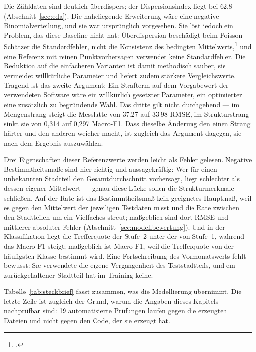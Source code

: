 Die Zähldaten sind deutlich überdispers; der Dispersionsindex liegt bei 62,8
(Abschnitt~\ref{sec:eda}). Die naheliegende Erweiterung wäre eine negative
Binomialverteilung, und sie war ursprünglich vorgesehen. Sie löst jedoch ein
Problem, das diese Baseline nicht hat: Überdispersion beschädigt beim
Poisson-Schätzer die Standardfehler, nicht die Konsistenz des bedingten
Mittelwerts,\footcite[5]{Gourieroux1981} und eine Referenz mit reinen
Punktvorhersagen verwendet keine Standardfehler. Die Reduktion auf die
einfacheren Varianten ist damit methodisch sauber, sie vermeidet willkürliche
Parameter und liefert zudem stärkere Vergleichswerte. Tragend ist das zweite
Argument: Ein Strafterm auf dem Vorgabewert der verwendeten Software wäre ein
willkürlich gesetzter Parameter, ein optimierter eine zusätzlich zu begründende
Wahl. Das dritte gilt nicht durchgehend --- im Mengenstrang steigt die
Messlatte von 37,27 auf 33,98 RMSE, im Strukturstrang sinkt sie von 0,314 auf
0,297 Macro-F1. Dass dieselbe Änderung den einen Strang härter und den anderen
weicher macht, ist zugleich das Argument dagegen, sie nach dem Ergebnis
auszuwählen.

Drei Eigenschaften dieser Referenzwerte werden leicht als Fehler gelesen.
Negative Bestimmtheitsmaße sind hier richtig und aussagekräftig: Wer für einen
unbekannten Stadtteil den Gesamtdurchschnitt vorhersagt, liegt schlechter als
dessen eigener Mittelwert --- genau diese Lücke sollen die Strukturmerkmale
schließen. Auf der Rate ist das Bestimmtheitsmaß kein geeignetes Hauptmaß, weil
es gegen den Mittelwert der jeweiligen Testdaten misst und die Rate zwischen
den Stadtteilen um ein Vielfaches streut; maßgeblich sind dort RMSE und
mittlerer absoluter Fehler (Abschnitt~\ref{sec:modellbewertung}). Und in der
Klassifikation liegt die Trefferquote der Stufe~2 unter der von Stufe~1,
während das Macro-F1 steigt; maßgeblich ist Macro-F1, weil die Trefferquote von
der häufigsten Klasse bestimmt wird. Eine Fortschreibung des Vormonatswerts
fehlt bewusst: Sie verwendete die eigene Vergangenheit des Teststadtteils, und
ein zurückgehaltener Stadtteil hat im Training keine.

Tabelle~\ref{tab:steckbrief} fasst zusammen, was die Modellierung übernimmt.
Die letzte Zeile ist zugleich der Grund, warum die Angaben dieses Kapitels
nachprüfbar sind: 19 automatisierte Prüfungen laufen gegen die erzeugten
Dateien und nicht gegen den Code, der sie erzeugt hat.

